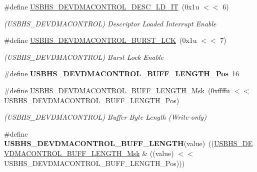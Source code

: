 \begin{DoxyCompactItemize}
\#define \mbox{\hyperlink{group__SAMS70__USBHS_ga86a14d59330c7ea07601a2b61ac6529e}{U\+S\+B\+H\+S\+\_\+\+D\+E\+V\+D\+M\+A\+C\+O\+N\+T\+R\+O\+L\+\_\+\+D\+E\+S\+C\+\_\+\+L\+D\+\_\+\+IT}}~(0x1u $<$$<$ 6)
\begin{DoxyCompactList}\small\item\em (U\+S\+B\+H\+S\+\_\+\+D\+E\+V\+D\+M\+A\+C\+O\+N\+T\+R\+OL) Descriptor Loaded Interrupt Enable \end{DoxyCompactList}\item 
\mbox{\label{group__SAMS70__USBHS_ga943997858212b2d56ab97dda52ffeb58}} 
\#define \mbox{\hyperlink{group__SAMS70__USBHS_ga943997858212b2d56ab97dda52ffeb58}{U\+S\+B\+H\+S\+\_\+\+D\+E\+V\+D\+M\+A\+C\+O\+N\+T\+R\+O\+L\+\_\+\+B\+U\+R\+S\+T\+\_\+\+L\+CK}}~(0x1u $<$$<$ 7)
\begin{DoxyCompactList}\small\item\em (U\+S\+B\+H\+S\+\_\+\+D\+E\+V\+D\+M\+A\+C\+O\+N\+T\+R\+OL) Burst Lock Enable \end{DoxyCompactList}\item 
\mbox{\label{group__SAMS70__USBHS_gaad173b16d3590fafce3d5e59024be02c}} 
\#define {\bfseries U\+S\+B\+H\+S\+\_\+\+D\+E\+V\+D\+M\+A\+C\+O\+N\+T\+R\+O\+L\+\_\+\+B\+U\+F\+F\+\_\+\+L\+E\+N\+G\+T\+H\+\_\+\+Pos}~16
\item 
\mbox{\label{group__SAMS70__USBHS_gab7cc3056aeb7d9b49c34b00988756993}} 
\#define \mbox{\hyperlink{group__SAMS70__USBHS_gab7cc3056aeb7d9b49c34b00988756993}{U\+S\+B\+H\+S\+\_\+\+D\+E\+V\+D\+M\+A\+C\+O\+N\+T\+R\+O\+L\+\_\+\+B\+U\+F\+F\+\_\+\+L\+E\+N\+G\+T\+H\+\_\+\+Msk}}~(0xffffu $<$$<$ U\+S\+B\+H\+S\+\_\+\+D\+E\+V\+D\+M\+A\+C\+O\+N\+T\+R\+O\+L\+\_\+\+B\+U\+F\+F\+\_\+\+L\+E\+N\+G\+T\+H\+\_\+\+Pos)
\begin{DoxyCompactList}\small\item\em (U\+S\+B\+H\+S\+\_\+\+D\+E\+V\+D\+M\+A\+C\+O\+N\+T\+R\+OL) Buffer Byte Length (Write-\/only) \end{DoxyCompactList}\item 
\mbox{\label{group__SAMS70__USBHS_gaeeee9e744d9b3b4e0d05fdee54fa1ba3}} 
\#define {\bfseries U\+S\+B\+H\+S\+\_\+\+D\+E\+V\+D\+M\+A\+C\+O\+N\+T\+R\+O\+L\+\_\+\+B\+U\+F\+F\+\_\+\+L\+E\+N\+G\+TH}(value)~((\mbox{\hyperlink{group__SAMV71__USBHS_gab7cc3056aeb7d9b49c34b00988756993}{U\+S\+B\+H\+S\+\_\+\+D\+E\+V\+D\+M\+A\+C\+O\+N\+T\+R\+O\+L\+\_\+\+B\+U\+F\+F\+\_\+\+L\+E\+N\+G\+T\+H\+\_\+\+Msk}} \& ((value) $<$$<$ U\+S\+B\+H\+S\+\_\+\+D\+E\+V\+D\+M\+A\+C\+O\+N\+T\+R\+O\+L\+\_\+\+B\+U\+F\+F\+\_\+\+L\+E\+N\+G\+T\+H\+\_\+\+Pos)))

\end{DoxyCompactItemize}
